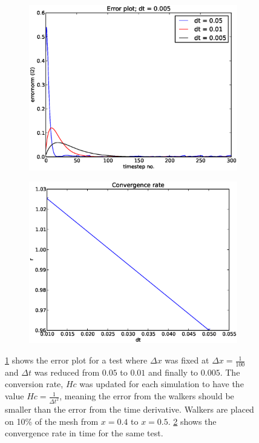 \begin{figure}[H]
 \centering
 \begin{subfigure}[b]{0.48\textwidth}
 \includegraphics[width=\textwidth]{../results/experiment_15042014_0608_convergence_tests_etc/results/errorplot.eps}
\caption{}  
 \label{combined_BE1d:errorplot}
 \end{subfigure}
 \begin{subfigure}[b]{0.48\textwidth}
  \includegraphics[width=\textwidth]{../results/experiment_15042014_0608_convergence_tests_etc/results/ConvergenceTest.eps}
  \caption{}
   \label{combined_BE1d:convergence}
 \end{subfigure}
 \caption[Error test for BE combined with RW in 1D]{\ref{combined_BE1d:errorplot} shows the error plot for a test where $\Delta x$ was fixed at $\Delta x = \frac{1}{100}$ and $\Delta t$ was reduced from $0.05$ to $0.01$ and finally to $0.005$. 
 The conversion rate, $Hc$ was updated for each simulation to have the value $Hc = \frac{1}{\Delta t^2}$, meaning the error from the walkers should be smaller than the error from the time derivative. 
 Walkers are placed on 10\% of the mesh from $x=0.4$ to $x=0.5$. 
 \ref{combined_BE1d:convergence} shows the convergence rate in time for the same test.}
 \label{combined_BE1d}
\end{figure}

